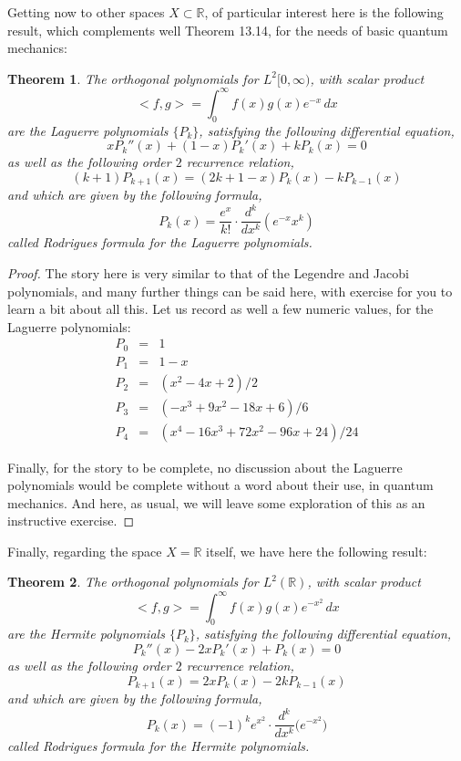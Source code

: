 \documentclass[12pt]{amsbook}
\newtheorem{theorem}{Theorem}[chapter]
\begin{document}
Getting now to other spaces $X\subset\mathbb R$, of particular interest here is the following result, which complements well Theorem 13.14, for the needs of basic quantum mechanics:


\begin{theorem}
The orthogonal polynomials for $L^2[0,\infty)$, with scalar product
$$<f,g>=\int_0^\infty f(x)g(x)e^{-x}\,dx$$
are the Laguerre polynomials $\{P_k\}$, satisfying the following differential equation,
$$xP_k''(x)+(1-x)P_k'(x)+kP_k(x)=0$$
as well as the following order $2$ recurrence relation,
$$(k+1)P_{k+1}(x)=(2k+1-x)P_k(x)-kP_{k-1}(x)$$
and which are given by the following formula,
$$P_k(x)=\frac{e^x}{k!}\cdot\frac{d^k}{dx^k}\left(e^{-x}x^k\right)$$
called Rodrigues formula for the Laguerre polynomials.
\end{theorem}

\begin{proof}
The story here is very similar to that of the Legendre and Jacobi polynomials, and many further things can be said here, with exercise for you to learn a bit about all this. Let us record as well a few numeric values, for the Laguerre polynomials:
\begin{eqnarray*}
P_0&=&1\\
P_1&=&1-x\\
P_2&=&(x^2-4x+2)/2\\
P_3&=&(-x^3+9x^2-18x+6)/6\\
P_4&=&(x^4-16x^3+72x^2-96x+24)/24
\end{eqnarray*}

Finally, for the story to be complete, no discussion about the Laguerre polynomials would be complete without a word about their use, in quantum mechanics. And here, as usual, we will leave some exploration of this as an instructive exercise.
\end{proof}

Finally, regarding the space $X=\mathbb R$ itself, we have here the following result:


\begin{theorem}
The orthogonal polynomials for $L^2(\mathbb R)$, with scalar product
$$<f,g>=\int_0^\infty f(x)g(x)e^{-x^2}\,dx$$
are the Hermite polynomials $\{P_k\}$, satisfying the following differential equation,
$$P_k''(x)-2xP_k'(x)+P_k(x)=0$$
as well as the following order $2$ recurrence relation,
$$P_{k+1}(x)=2xP_k(x)-2kP_{k-1}(x)$$
and which are given by the following formula,
$$P_k(x)=(-1)^k e^{x^2}\cdot\frac{d^k}{dx^k}\big(e^{-x^2}\big)$$
called Rodrigues formula for the Hermite polynomials.
\end{theorem}
\end{document}
